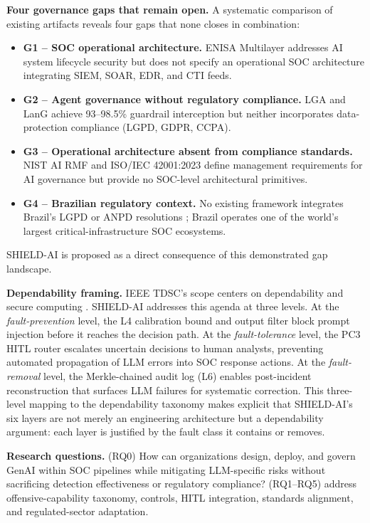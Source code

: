 \documentclass[journal]{IEEEtran}
\begin{document}
\textbf{Four governance gaps that remain open.}
A systematic comparison of existing artifacts reveals four gaps that none closes in combination:
\begin{itemize}[noitemsep,leftmargin=1em]
  \item \textbf{G1 -- SOC operational architecture.}
    ENISA Multilayer \cite{enisa2023multilayer} addresses AI system lifecycle security but does
    not specify an operational SOC architecture integrating SIEM, SOAR, EDR, and CTI feeds.
  \item \textbf{G2 -- Agent governance without regulatory compliance.}
    LGA \cite{lga2026} and LanG \cite{lang2026} achieve 93--98.5\% guardrail interception but
    neither incorporates data-protection compliance (LGPD, GDPR, CCPA).
  \item \textbf{G3 -- Operational architecture absent from compliance standards.}
    NIST AI RMF \cite{nist2023airmf} and ISO/IEC 42001:2023 \cite{iso42001} define management
    requirements for AI governance but provide no SOC-level architectural primitives.
  \item \textbf{G4 -- Brazilian regulatory context.}
    No existing framework integrates Brazil's LGPD \cite{lgpd2018} or ANPD resolutions
    \cite{anpd15}; Brazil operates one of the world's largest critical-infrastructure SOC
    ecosystems.
\end{itemize}
SHIELD-AI is proposed as a direct consequence of this demonstrated gap landscape.

\textbf{Dependability framing.}
IEEE TDSC's scope centers on dependability and secure computing \cite{avizienis2004dependability}.
SHIELD-AI addresses this agenda at three levels. At the \emph{fault-prevention} level,
the L4 calibration bound and output filter block prompt injection before it reaches the
decision path. At the \emph{fault-tolerance} level, the PC3 HITL router escalates uncertain
decisions to human analysts, preventing automated propagation of LLM errors into SOC
response actions. At the \emph{fault-removal} level, the Merkle-chained audit log (L6)
enables post-incident reconstruction that surfaces LLM failures for systematic correction.
This three-level mapping to the dependability taxonomy makes explicit that SHIELD-AI's
six layers are not merely an engineering architecture but a dependability argument: each
layer is justified by the fault class it contains or removes.

\textbf{Research questions.}
(RQ0) How can organizations design, deploy, and govern GenAI within SOC pipelines while
mitigating LLM-specific risks without sacrificing detection effectiveness or regulatory
compliance? (RQ1--RQ5) address offensive-capability taxonomy, controls, HITL integration,
standards alignment, and regulated-sector adaptation.
\end{document}
